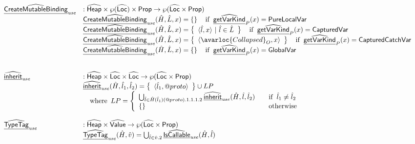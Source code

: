 \[\begin{array}{ll}
\ahf{CreateMutableBinding}_{\it use} & : \aHeap \times \powerset{\aLoc} \times \SF{Prop} \rightarrow \powerset{\aLoc \times \SF{Prop}}\\
  & \ahf{CreateMutableBinding}_{\it use}(\hat{H},\hat{L}, x) = \set{}\quad\ifc{\ahf{getVarKind}_P(x) = \SF{PureLocalVar}}\\
  & \ahf{CreateMutableBinding}_{\it use}(\hat{H},\hat{L}, x) = \set{\langle\hat{l},x\rangle~|~\hat{l}\in\hat{L}}\quad\ifc{\ahf{getVarKind}_P(x) = \SF{CapturedVar}}\\
  & \ahf{CreateMutableBinding}_{\it use}(\hat{H},\hat{L}, x) = \set{\langle\avarloc{Collapsed}_O,x\rangle}\quad\ifc{\ahf{getVarKind}_P(x) = \SF{CapturedCatchVar}}\\
  & \ahf{CreateMutableBinding}_{\it use}(\hat{H},\hat{L}, x) = \set{}\quad\ifc{\ahf{getVarKind}_P(x) = \SF{GlobalVar}}\\
\\\\
\ahf{inherit}_{\it use} & : \aHeap \times \aLoc \times \aLoc \rightarrow \powerset{\aLoc \times \SF{Prop}}\\
& \ahf{inherit}_{\it use}(\hat{H},\hat{l}_1,\hat{l}_2) = \set{\langle\hat{l}_1,\varprop{proto}\rangle}\cup LP\\
&\quad\wherec{
  LP = \left\{
    \begin{array}{ll}
      \bigcup_{\hat{l}\in\hat{H}(\hat{l}_1)(\varprop{proto}).1.1.1.2}\ahf{inherit}_{\it use}(\hat{H},\hat{l},\hat{l}_2)&\quad\ifc{\hat{l}_1\not=\hat{l}_2}\\
      \set{}&\quad\owc
    \end{array}
  \right.
}
\\\\
\ahf{TypeTag}_{\it use} & : \aHeap \times \aValue \rightarrow \powerset{\aLoc \times \SF{Prop}}\\
& \ahf{TypeTag}_{\it use}(\hat{H},\hat{v}) = \bigcup_{\hat{l}\in\hat{v}.2}\ahf{IsCallable}_{\it use}(\hat{H},\hat{l})
\end{array}
\]
